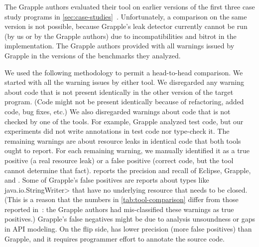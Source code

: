 The Grapple authors evaluated their tool on earlier versions of the first three
case study programs in \cref{sec:case-studies}~\cite{zuo2019grapple}.
Unfortunately, a comparison on the same version is not possible, because
Grapple's leak detector currently cannot be run
(by us or by the Grapple authors)
due to
incompatibilities and bitrot in the implementation.
The Grapple authors provided with
all warnings issued by Grapple in the
versions of the benchmarks they analyzed.

We used the following methodology to permit a head-to-head comparison.
We started with all the warning issues by either tool.
We disregarded any warning about code that is not present identically in the other
version of the target program.  (Code might not be present identically because of refactoring,
added code, bug fixes, etc.)  We also disregarded warnings about code that
is not checked by one of the tools.  For example, Grapple analyzed test
code, but our experiments did not write annotations in test code nor
type-check it.  The remaining warnings are
about resource leaks in identical code that both tools ought to report.
For each remaining warning, we manually identified it as a true positive (a
real resource leak) or a false positive (correct code, but the tool cannot
determine that fact).   reports the precision
and recall of Eclipse, Grapple, and \tool.  Some of
Grapple's false positives are reports about types like
\<java.io.StringWriter> that have no underlying resource that needs to be
closed.
(This is a reason that the numbers in \cref{tab:tool-comparison} differ
from those reported in~\cite{zuo2019grapple}:  the Grapple authors had
mis-classified these warnings as true positives.)
Grapple's false negatives might be due to analysis unsoundness or gaps in API
modeling.
On the flip side, \tool has lower precision (more false positives)
than Grapple, and it requires programmer effort to annotate the source code.  

